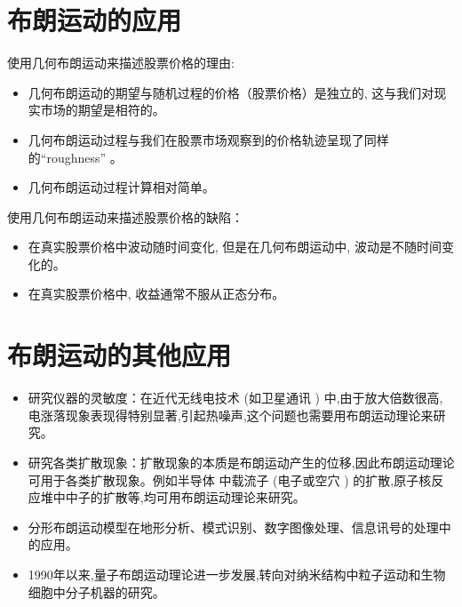 \documentclass[UTF8]{ctexart}
\begin{document}
\section{布朗运动的应用}
使用几何布朗运动来描述股票价格的理由:
\begin{itemize}
  \item 几何布朗运动的期望与随机过程的价格（股票价格）是独立的, 这与我们对现实市场的期望是相符的。
  \item 几何布朗运动过程与我们在股票市场观察到的价格轨迹呈现了同样的“roughness” 。
  \item 几何布朗运动过程计算相对简单。
\end{itemize}

使用几何布朗运动来描述股票价格的缺陷：
\begin{itemize}
  \item 在真实股票价格中波动随时间变化, 但是在几何布朗运动中, 波动是不随时间变化的。
  \item 在真实股票价格中, 收益通常不服从正态分布。
\end{itemize}



\section{布朗运动的其他应用}
\begin{itemize}
  \item 研究仪器的灵敏度：在近代无线电技术 (如卫星通讯 ) 中,由于放大倍数很高,电涨落现象表现得特别显著,引起热噪声,这个问题也需要用布朗运动理论来研究。
  \item 研究各类扩散现象：扩散现象的本质是布朗运动产生的位移,因此布朗运动理论可用于各类扩散现象。例如半导体 中载流子 (电子或空穴 ) 的扩散,原子核反应堆中中子的扩散等,均可用布朗运动理论来研究。
  \item 分形布朗运动模型在地形分析、模式识别、数字图像处理、信息讯号的处理中的应用。
  \item 1990年以来,量子布朗运动理论进一步发展,转向对纳米结构中粒子运动和生物细胞中分子机器的研究。
\end{itemize}
\end{document}
